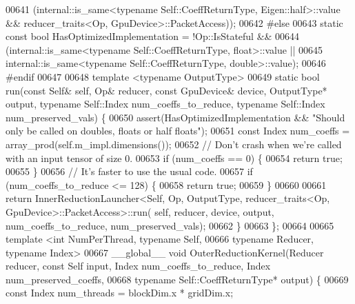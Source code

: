 \begin{DoxyCode}
00641        (internal::is\_same<typename Self::CoeffReturnType, Eigen::half>::value && reducer\_traits<Op,
       GpuDevice>::PacketAccess));
00642 \textcolor{preprocessor}{#else}
00643   \textcolor{keyword}{static} \textcolor{keyword}{const} \textcolor{keywordtype}{bool} HasOptimizedImplementation = !Op::IsStateful &&
00644                                                  (internal::is\_same<typename Self::CoeffReturnType,
       float>::value ||
00645                                                   internal::is\_same<typename Self::CoeffReturnType,
       double>::value);
00646 \textcolor{preprocessor}{#endif}
00647 
00648   \textcolor{keyword}{template} <\textcolor{keyword}{typename} OutputType>
00649   \textcolor{keyword}{static} \textcolor{keywordtype}{bool} run(\textcolor{keyword}{const} Self& \textcolor{keyword}{self}, Op& reducer, \textcolor{keyword}{const} GpuDevice& device, OutputType* output, \textcolor{keyword}{typename} 
      Self::Index num\_coeffs\_to\_reduce, \textcolor{keyword}{typename} Self::Index num\_preserved\_vals) \{
00650     assert(HasOptimizedImplementation && \textcolor{stringliteral}{"Should only be called on doubles, floats or half floats"});
00651     \textcolor{keyword}{const} Index num\_coeffs = array\_prod(\textcolor{keyword}{self}.m\_impl.dimensions());
00652     \textcolor{comment}{// Don't crash when we're called with an input tensor of size 0.}
00653     \textcolor{keywordflow}{if} (num\_coeffs == 0) \{
00654       \textcolor{keywordflow}{return} \textcolor{keyword}{true};
00655     \}
00656     \textcolor{comment}{// It's faster to use the usual code.}
00657     \textcolor{keywordflow}{if} (num\_coeffs\_to\_reduce <= 128) \{
00658       \textcolor{keywordflow}{return} \textcolor{keyword}{true};
00659     \}
00660 
00661     \textcolor{keywordflow}{return} InnerReductionLauncher<Self, Op, OutputType, reducer\_traits<Op, GpuDevice>::PacketAccess>::run(\textcolor{keyword}{
      self}, reducer, device, output, num\_coeffs\_to\_reduce, num\_preserved\_vals);
00662   \}
00663 \};
00664 
00665 \textcolor{keyword}{template} <\textcolor{keywordtype}{int} NumPerThread, \textcolor{keyword}{typename} Self,
00666           \textcolor{keyword}{typename} Reducer, \textcolor{keyword}{typename} Index>
00667 \_\_global\_\_ \textcolor{keywordtype}{void} OuterReductionKernel(Reducer reducer, \textcolor{keyword}{const} Self input, Index num\_coeffs\_to\_reduce, Index 
      num\_preserved\_coeffs,
00668                                      \textcolor{keyword}{typename} Self::CoeffReturnType* output) \{
00669   \textcolor{keyword}{const} Index num\_threads = blockDim.x * gridDim.x;

\end{DoxyCode}
